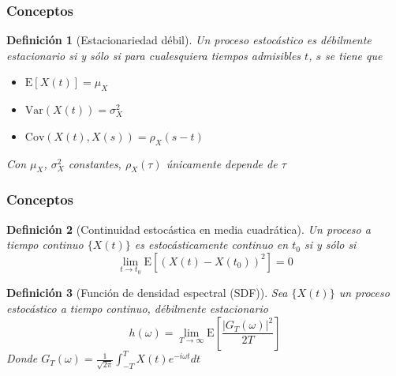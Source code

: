 \documentclass{beamer}
\newtheorem{defn}{Definici\'on}
\newtheorem{thrm}{Teorema}
\newcommand{\E}[1]{\mathrm{E}\left[ #1 \right]}
\newcommand{\Var}[1]{\mathrm{Var}\left( #1 \right)}
\newcommand{\Cov}[1]{\mathrm{Cov}\left( #1 \right)}
\newcommand{\abso}[1]{\left| #1 \right|}
\begin{document}
\begin{frame}\frametitle{Conceptos}
\begin{defn}[Estacionariedad d\'ebil]
%
Un proceso estoc\'astico es d\'ebilmente estacionario si y s\'olo si %
para cualesquiera tiempos admisibles $t$, $s$ se tiene que
\begin{itemize}
\item $\E{X(t)} = \mu_X$
\item $\Var{X(t)} = \sigma^{2}_X$
\item $\Cov{X(t),X(s)} = \rho_X (s-t)$
\end{itemize}
Con $\mu_X$, $\sigma^{2}_X$ constantes, $\rho_X(\tau)$ \'unicamente depende de $\tau$
\end{defn}
\end{frame}


\begin{frame}\frametitle{Conceptos}
\begin{defn}[Continuidad estoc\'astica en media cuadr\'atica]
Un proceso a tiempo continuo $\{ X(t) \}$ es estoc\'asticamente continuo
en $t_0$ si y s\'olo si
\begin{equation*}
\lim_{t \rightarrow t_0} \E{\left( X\left(t\right) - X\left(t_0\right) \right)^{2}} = 0
\end{equation*}
\end{defn}

%
%
\begin{defn}[Funci\'on de densidad espectral (SDF)]
Sea $\{X(t)\}$ un proceso estoc\'astico a tiempo continuo, d\'ebilmente estacionario
\begin{equation*}
h(\omega) = \lim_{T\rightarrow \infty} \E{ \frac{ \left| G_T(\omega) \right|^{2}}{2 T} }
\end{equation*}
Donde $\displaystyle G_T (\omega) = \frac{1}{\sqrt{2 \pi}} \int_{-T}^{T} X(t) e^{-i \omega t} dt$
\end{defn}
\end{frame}
\end{document}
